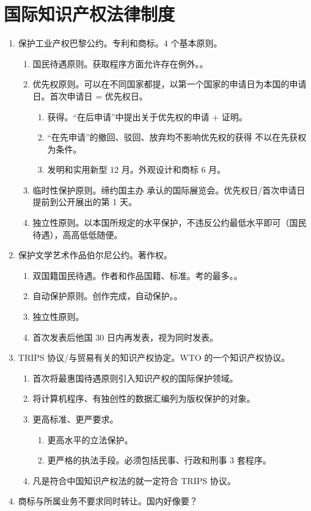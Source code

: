 \section{国际知识产权法律制度}
\begin{enumerate}
  \item 保护工业产权巴黎公约。专利和商标。4 个基本原则。
        \begin{enumerate}
          \item 国民待遇原则。获取程序方面允许存在例外。。
          \item 优先权原则。可以在不同国家都提，以第一个国家的申请日为本国的申请日。首次申请日 = 优先权日。
                \begin{enumerate}
                  \item 获得。“在后申请”中提出关于优先权的申请 + 证明。
                  \item “在先申请”的撤回、驳回、放弃均不影响优先权的获得 \yjt 不以在先获权为条件。
                  \item 发明和实用新型 12 月。外观设计和商标 6 月。
                \end{enumerate}
          \item 临时性保护原则。缔约国主办 \hz 承认的国际展览会。优先权日/首次申请日提前到公开展出的第 1 天。
          \item 独立性原则。以本国所规定的水平保护，不违反公约最低水平即可（国民待遇），高高低低随便。
        \end{enumerate}
  \item 保护文学艺术作品伯尔尼公约。著作权。
        \begin{enumerate}
          \item 双国籍国民待遇。作者和作品国籍、\dydy 标准。考的最多。。
          \item 自动保护原则。创作完成，自动保护。。
          \item 独立性原则。
          \item 首次发表后他国 30 日内再发表，视为同时发表。
        \end{enumerate}
  \item TRIPS 协议/与贸易有关的知识产权协定。WTO 的一个知识产权协议。
        \begin{enumerate}
          \item 首次将最惠国待遇原则引入知识产权的国际保护领域。
          \item 将计算机程序、有独创性的数据汇编列为版权保护的对象。
          \item 更高标准、更严要求。
                \begin{enumerate}
                  \item 更高水平的立法保护。
                  \item 更严格的执法手段。必须包括民事、行政和刑事 3 套程序。
                \end{enumerate}
          \item 凡是符合中国知识产权法的就一定符合 TRIPS 协议。
        \end{enumerate}
  \item 商标与所属业务不要求同时转让。国内好像要？
\end{enumerate}
